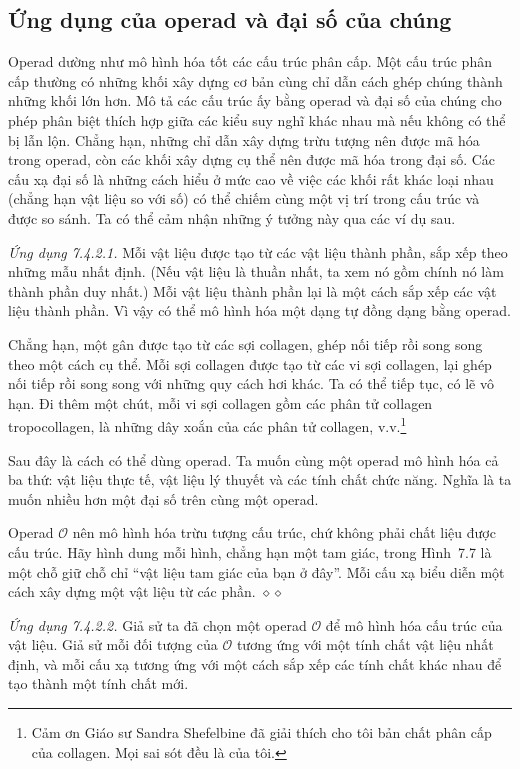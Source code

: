 \subsection{Ứng dụng của operad và đại số của chúng}
Operad dường như mô hình hóa tốt các cấu trúc phân cấp. Một cấu trúc phân cấp thường có những khối xây dựng cơ bản cùng chỉ dẫn cách ghép chúng thành những khối lớn hơn. Mô tả các cấu trúc ấy bằng operad và đại số của chúng cho phép phân biệt thích hợp giữa các kiểu suy nghĩ khác nhau mà nếu không có thể bị lẫn lộn. Chẳng hạn, những chỉ dẫn xây dựng trừu tượng nên được mã hóa trong operad, còn các khối xây dựng cụ thể nên được mã hóa trong đại số. Các cấu xạ đại số là những cách hiểu ở mức cao về việc các khối rất khác loại nhau (chẳng hạn vật liệu so với số) có thể chiếm cùng một vị trí trong cấu trúc và được so sánh. Ta có thể cảm nhận những ý tưởng này qua các ví dụ sau.

\noindent\textit{Ứng dụng 7.4.2.1.}\keepwithnext
Mỗi vật liệu được tạo từ các vật liệu thành phần, sắp xếp theo những mẫu nhất định. (Nếu vật liệu là thuần nhất, ta xem nó gồm chính nó làm thành phần duy nhất.) Mỗi vật liệu thành phần lại là một cách sắp xếp các vật liệu thành phần. Vì vậy có thể mô hình hóa một dạng tự đồng dạng bằng operad.

Chẳng hạn, một gân được tạo từ các sợi collagen, ghép nối tiếp rồi song song theo một cách cụ thể. Mỗi sợi collagen được tạo từ các vi sợi collagen, lại ghép nối tiếp rồi song song với những quy cách hơi khác. Ta có thể tiếp tục, có lẽ vô hạn. Đi thêm một chút, mỗi vi sợi collagen gồm các phân tử collagen tropocollagen, là những dây xoắn của các phân tử collagen, v.v.\footnote{Cảm ơn Giáo sư Sandra Shefelbine đã giải thích cho tôi bản chất phân cấp của collagen. Mọi sai sót đều là của tôi.}

Sau đây là cách có thể dùng operad. Ta muốn cùng một operad mô hình hóa cả ba thứ: vật liệu thực tế, vật liệu lý thuyết và các tính chất chức năng. Nghĩa là ta muốn nhiều hơn một đại số trên cùng một operad.

Operad $\mathcal O$ nên mô hình hóa trừu tượng cấu trúc, chứ không phải chất liệu được cấu trúc. Hãy hình dung mỗi hình, chẳng hạn một tam giác, trong Hình~7.7 là một chỗ giữ chỗ chỉ ``vật liệu tam giác của bạn ở đây''. Mỗi cấu xạ biểu diễn một cách xây dựng một vật liệu từ các phần.
\hfill$\diamond\diamond$

\noindent\textit{Ứng dụng 7.4.2.2.}\keepwithnext
Giả sử ta đã chọn một operad $\mathcal O$ để mô hình hóa cấu trúc của vật liệu. Giả sử mỗi đối tượng của $\mathcal O$ tương ứng với một tính chất vật liệu nhất định, và mỗi cấu xạ tương ứng với một cách sắp xếp các tính chất khác nhau để tạo thành một tính chất mới.

